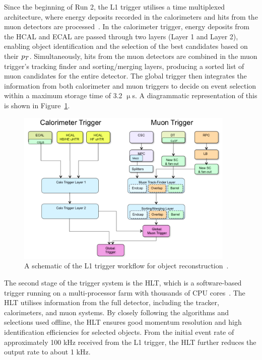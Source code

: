 Since the beginning of Run 2, the \ac{L1} trigger utilises a time multiplexed architecture, where energy deposits recorded in the calorimeters and hits from the muon detectors are processed~\cite{Tapper:2013yva}. 
In the calorimeter trigger, energy deposits from the \ac{HCAL} and \ac{ECAL} are passed through two layers (Layer 1 and Layer 2), enabling object identification and the selection of the best candidates based on their $p_{T}$. 
Simultaneously, hits from the muon detectors are combined in the muon trigger's tracking finder and sorting/merging layers, producing a sorted list of muon candidates for the entire detector. 
The global trigger then integrates the information from both calorimeter and muon triggers to decide on event selection within a maximum storage time of 3.2 $\upmu$s.
A diagrammatic representation of this is shown in Figure~\ref{fig:trigger}. \\

\begin{figure}[!hbtp]
    \centering
    \includegraphics[width=0.93\textwidth]{Figures/trigger.png}
    \caption[Diagram of the CMS L1 trigger workflow.]{A schematic of the L1 trigger workflow for object reconstruction~\cite{Tapper:2013yva}.}
    \label{fig:trigger}
\end{figure}

The second stage of the trigger system is the \ac{HLT}, which is a software-based trigger running on a multi-processor farm with thousands of CPU cores~\cite{CMS_trigger,CMSTrigger:2005yhe}. 
The \ac{HLT} utilises information from the full detector, including the tracker, calorimeters, and muon systems. 
By closely following the algorithms and selections used offline, the \ac{HLT} ensures good momentum resolution and high identification efficiencies for selected objects. 
From the initial event rate of approximately 100 kHz received from the \ac{L1} trigger, the \ac{HLT} further reduces the output rate to about 1 kHz. \\

